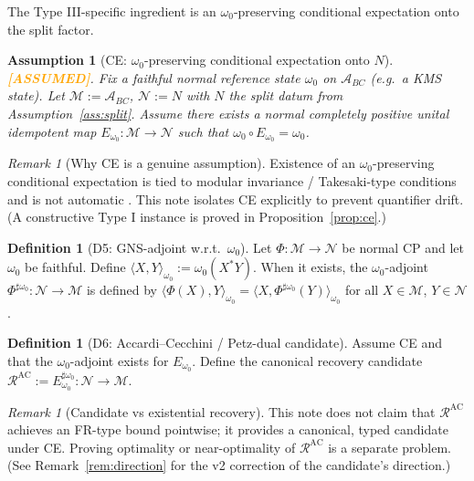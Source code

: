 \documentclass[11pt]{article}
\newtheorem{assumption}[theorem]{Assumption}
\theoremstyle{definition}
\newtheorem{definition}[theorem]{Definition}
\theoremstyle{remark}
\newtheorem{remark}[theorem]{Remark}
\newcommand{\ASSUMED}{\textcolor{orange}{\textbf{[ASSUMED]}}}
\newcommand{\cA}{\mathcal{A}}
\newcommand{\cN}{\mathcal{N}}
\newcommand{\cM}{\mathcal{M}}
\newcommand{\cR}{\mathcal{R}}
\begin{document}
The Type III-specific ingredient is an $\omega_0$-preserving conditional
expectation onto the split factor.

\begin{assumption}[CE: $\omega_0$-preserving conditional expectation
onto $N$]
\label{ass:ce}
\ASSUMED. Fix a faithful normal reference state $\omega_0$ on $\cA_{BC}$
(e.g.\ a KMS state). Let $\cM := \cA_{BC}$, $\cN := N$ with $N$ the
split datum from Assumption~\ref{ass:split}. Assume there exists a
normal completely positive unital idempotent map $E_{\omega_0}: \cM \to
\cN$ such that $\omega_0 \circ E_{\omega_0} = \omega_0$.
\end{assumption}

\begin{remark}[Why CE is a genuine assumption]
\label{rem:cegenuine}
Existence of an $\omega_0$-preserving conditional expectation is tied to
modular invariance / Takesaki-type conditions and is not automatic
\cite{Takesaki}. This note isolates CE explicitly to prevent quantifier
drift. (A constructive Type I instance is proved in
Proposition~\ref{prop:ce}.)
\end{remark}

\begin{definition}[D5: GNS-adjoint w.r.t.\ $\omega_0$]
\label{def:gnsadjoint}
Let $\Phi: \cM \to \cN$ be normal CP and let $\omega_0$ be faithful.
Define $\langle X, Y \rangle_{\omega_0} := \omega_0(X^* Y)$. When it
exists, the $\omega_0$-adjoint $\Phi^{\sharp\omega_0}: \cN \to \cM$ is
defined by $\langle \Phi(X), Y \rangle_{\omega_0} = \langle X,
\Phi^{\sharp\omega_0}(Y) \rangle_{\omega_0}$ for all $X \in \cM$, $Y \in
\cN$.
\end{definition}

\begin{definition}[D6: Accardi--Cecchini / Petz-dual candidate]
\label{def:ac}
Assume CE and that the $\omega_0$-adjoint exists for $E_{\omega_0}$.
Define the canonical recovery candidate $\cR^{\mathrm{AC}} :=
E_{\omega_0}^{\sharp\omega_0}: \cN \to \cM$.
\end{definition}

\begin{remark}[Candidate vs existential recovery]
\label{rem:candidate}
This note does not claim that $\cR^{\mathrm{AC}}$ achieves an FR-type
bound pointwise; it provides a canonical, typed candidate under CE.
Proving optimality or near-optimality of $\cR^{\mathrm{AC}}$ is a
separate problem. (See Remark~\ref{rem:direction} for the v2 correction
of the candidate's direction.)
\end{remark}
\end{document}
